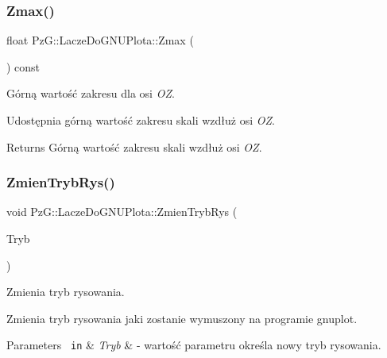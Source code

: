 \subsubsection{\texorpdfstring{Zmax()}{Zmax()}}
{\footnotesize\ttfamily float Pz\+G\+::\+Lacze\+Do\+G\+N\+U\+Plota\+::\+Zmax (\begin{DoxyParamCaption}{ }\end{DoxyParamCaption}) const\hspace{0.3cm}{\ttfamily [inline]}}



Górną wartość zakresu dla osi {\itshape OZ}. 

Udostępnia górną wartość zakresu skali wzdłuż osi {\itshape OZ}. \begin{DoxyReturn}{Returns}
Górną wartość zakresu skali wzdłuż osi {\itshape OZ}. 
\end{DoxyReturn}
\mbox{\label{class_pz_g_1_1_lacze_do_g_n_u_plota_ae92c65357bf682478cc68f77885b61d8}} 
\subsubsection{\texorpdfstring{ZmienTrybRys()}{ZmienTrybRys()}}
{\footnotesize\ttfamily void Pz\+G\+::\+Lacze\+Do\+G\+N\+U\+Plota\+::\+Zmien\+Tryb\+Rys (\begin{DoxyParamCaption}\item[{\mbox{\hyperlink{namespace_pz_g_aef59d70a0ee2eab473790613c3628944}{Typ\+Trybu\+Rysowania}}}]{Tryb }\end{DoxyParamCaption})\hspace{0.3cm}{\ttfamily [inline]}}



Zmienia tryb rysowania. 

Zmienia tryb rysowania jaki zostanie wymuszony na programie {\ttfamily gnuplot}. 
\begin{DoxyParams}[1]{Parameters}
\mbox{\texttt{ in}}  & {\em Tryb} & -\/ wartość parametru określa nowy tryb rysowania. \\
\hline
\end{DoxyParams}
\mbox{\label{class_pz_g_1_1_lacze_do_g_n_u_plota_a9068bd9a9873ba9c6d70016f1ae7cd7f}} 
